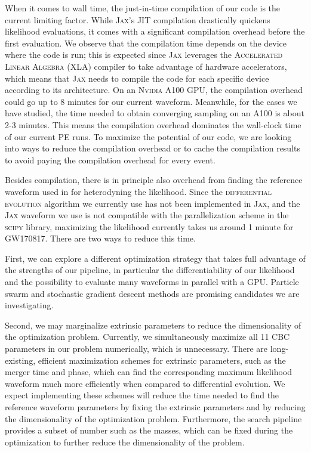 \documentclass[twocolumn]{aastex631}
\begin{document}
When it comes to wall time, the just-in-time compilation of our code is the
current limiting factor.  While \textsc{Jax}'s JIT compilation drastically
quickens likelihood evaluations, it comes with a significant compilation
overhead before the first evaluation. We observe that the compilation time
depends on the device where the code is run; this is expected since
\textsc{Jax} leverages the \textsc{Accelerated Linear Algebra} (XLA) compiler
to take advantage of hardware accelerators, which means that \textsc{Jax} needs
to compile the code for each specific device according to its architecture. On
an \textsc{Nvidia} A100 GPU, the compilation overhead could go up to 8 minutes
for our current waveform. Meanwhile, for the cases we have studied, the time
needed to obtain converging sampling on an A100 is about 2-3 minutes. This
means the compilation overhead dominates the wall-clock time of our current PE
runs. To maximize the potential of our code, we are looking into ways to reduce
the compilation overhead or to cache the compilation results to avoid paying
the compilation overhead for every event.

Besides compilation, there is in principle also overhead from finding the
reference waveform used in for heterodyning the likelihood. Since the
\textsc{differential evolution} algorithm we currently use has not been
implemented in \textsc{Jax}, and the \textsc{Jax} waveform we use is not
compatible with the parallelization scheme in the \textsc{scipy} library,
maximizing the likelihood currently takes us around 1 minute for GW170817. There
are two ways to reduce this time.

First, we can explore a different optimization strategy that
takes full advantage of the strengths of our pipeline, in particular the
differentiability of our likelihood and the possibility to evaluate many
waveforms in parallel with a GPU. Particle swarm \citep{7869491} and stochastic
gradient descent methods \citep{10.5555/304710.304720} are promising candidates
we are investigating.

Second, we may marginalize extrinsic parameters to reduce the dimensionality of
the optimization problem. Currently, we simultaneously maximize all 11 CBC
parameters in our problem numerically, which is unnecessary. There are
long-existing, efficient maximization schemes for extrinsic parameters, such as
the merger time and phase, which can find the corresponding maximum likelihood
waveform much more efficiently when compared to differential evolution. We
expect implementing these schemes will reduce the time needed to find the
reference waveform parameters by fixing the extrinsic parameters and by reducing
the dimensionality of the optimization problem. Furthermore, the search pipeline
provides a subset of number such as the masses, which can be fixed during the
optimization to further reduce the dimensionality of the problem.
\end{document}
